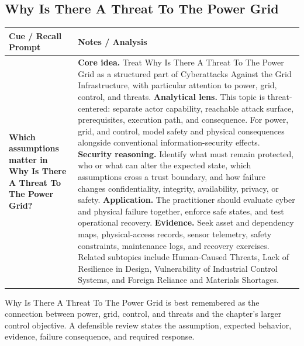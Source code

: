 \documentclass[11pt]{article}
\newcommand{\CornellHeader}{%
\rowcolor{Navy}\color{white}\bfseries Cue / Recall Prompt & \color{white}\bfseries Notes / Analysis\\\hline}
\newcommand{\CornellRow}[2]{%
\cellcolor{CueGray}\RaggedRight\textbf{#1} & \RaggedRight #2\\\hline}
\begin{document}
\subsection*{Why Is There A Threat To The Power Grid}
\begin{longtable}{>{\RaggedRight\arraybackslash}p{}|>{\RaggedRight\arraybackslash}p{}}
\CornellHeader
\CornellRow{Which assumptions matter in Why Is There A Threat To The Power Grid?}{\textbf{Core idea.} Treat Why Is There A Threat To The Power Grid as a structured part of Cyberattacks Against the Grid Infrastructure, with particular attention to power, grid, control, and threats. \textbf{Analytical lens.} This topic is threat-centered: separate actor capability, reachable attack surface, prerequisites, execution path, and consequence. For power, grid, and control, model safety and physical consequences alongside conventional information-security effects. \textbf{Security reasoning.} Identify what must remain protected, who or what can alter the expected state, which assumptions cross a trust boundary, and how failure changes confidentiality, integrity, availability, privacy, or safety. \textbf{Application.} The practitioner should evaluate cyber and physical failure together, enforce safe states, and test operational recovery. \textbf{Evidence.} Seek asset and dependency maps, physical-access records, sensor telemetry, safety constraints, maintenance logs, and recovery exercises. Related subtopics include Human-Caused Threats, Lack of Resilience in Design, Vulnerability of Industrial Control Systems, and Foreign Reliance and Materials Shortages.}
\end{longtable}
\begin{topicsummary}
Why Is There A Threat To The Power Grid is best remembered as the connection between power, grid, control, and threats and the chapter's larger control objective. A defensible review states the assumption, expected behavior, evidence, failure consequence, and required response.
\end{topicsummary}
\end{document}
